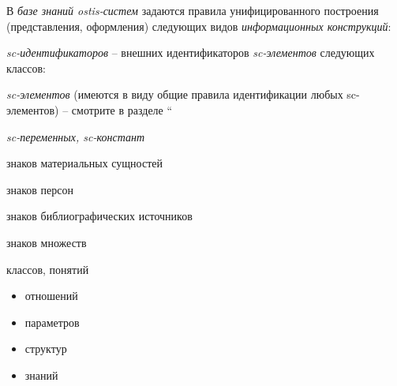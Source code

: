 \begin{SCn}
\begin{scnsubstruct}
{            В \textit{базе знаний ostis-систем} задаются правила унифицированного построения
            (представления, оформления) следующих видов \textit{информационных
                конструкций}:
            \begin{scnitemize}
                \item{\textit{sc-идентификаторов} -- внешних идентификаторов
                            \textit{sc-элементов} следующих классов:
                            \begin{scnitemizeii}
                                \item{\textit{sc-элементов} (имеются в виду общие правила идентификации
                                            любых sc-элементов) -- смотрите в разделе ``}
                                \item{\textit{sc-переменных, sc-констант}}
                                \item{знаков материальных сущностей
                                            \begin{scnitemizeiii}
                                                \item{знаков персон}
                                                \item{знаков библиографических источников}
                                            \end{scnitemizeiii}}
                                \item{знаков множеств
                                            \begin{scnitemizeiii}
                                                \item{классов, понятий
                                                            \begin{itemize}
                                                                \item{отношений}
                                                                \item{параметров}
                                                                \item{структур}
                                                                \item{знаний}
                                                            \end{itemize}
                                                      }
                                            \end{scnitemizeiii}}

\end{scnitemizeii}}
\end{scnitemize}}
\end{scnsubstruct}
\end{SCn}
